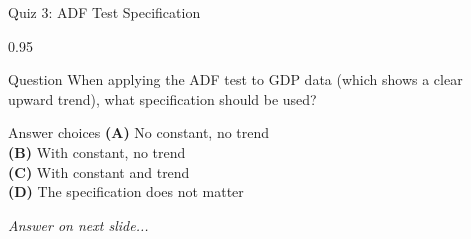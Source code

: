 \documentclass[9pt, aspectratio=169, t]{beamer}
\begin{document}
\begin{frame}{Quiz 3: ADF Test Specification}
    \begin{cminipage}{0.95\textwidth}
    \begin{alertblock}{Question}
        When applying the ADF test to GDP data (which shows a clear upward trend), what specification should be used?
    \end{alertblock}

    \vspace{0.4cm}

    \begin{block}{Answer choices}
        \textcolor{MainBlue}{\textbf{(A)}} No constant, no trend\\[3pt]
        \textcolor{MainBlue}{\textbf{(B)}} With constant, no trend\\[3pt]
        \textcolor{MainBlue}{\textbf{(C)}} With constant and trend\\[3pt]
        \textcolor{MainBlue}{\textbf{(D)}} The specification does not matter
    \end{block}

    \vspace{0.5cm}

    \begin{center}
        \textit{Answer on next slide...}
    \end{center}
    \end{cminipage}
\end{frame}
\end{document}
